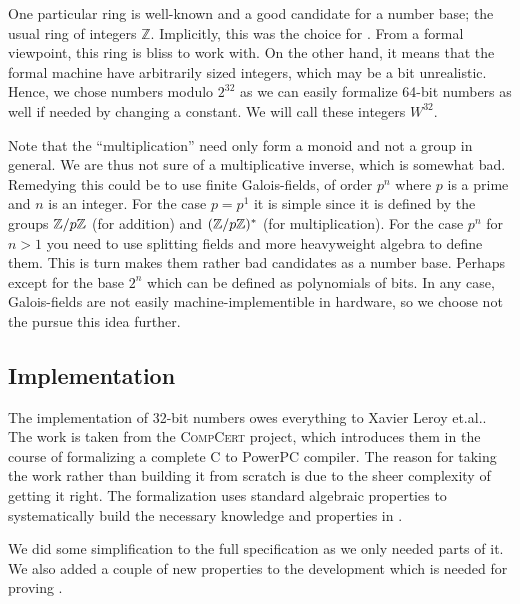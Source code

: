 One particular ring is well-known and a good candidate for a number
base; the usual ring of integers $\mathbb{Z}$. Implicitly,
this was the choice for \janusz{}. From a formal viewpoint, this ring
is bliss to work with. On the other hand, it means that the formal
machine have arbitrarily sized integers, which may be a bit
unrealistic. Hence, we chose numbers modulo $2^{32}$ as we can easily
formalize 64-bit numbers as well if needed by changing a constant. We
will call these integers $W^{32}$.

\begin{rem}
  Note that the ``multiplication'' need only form a monoid and not a
  group in general. We are thus not sure of a multiplicative inverse,
  which is somewhat bad. Remedying this could be to use finite
  Galois-fields, of order $p^n$ where $p$ is a prime and $n$ is an
  integer. For the case $p = p^1$ it is simple since it is defined by
  the groups $\mathbb{Z} / p\mathbb{Z}$ (for addition) and $(\mathbb{Z} / p\mathbb{Z})^{*}$ (for
  multiplication). For the case $p^n$ for $n > 1$ you need to use
  splitting fields and more heavyweight algebra to define them. This
  is turn makes them rather bad candidates as a number base. Perhaps
  except for the base $2^n$ which can be defined as polynomials of
  bits. In any case, Galois-fields are not easily
  machine-implementible in hardware, so we choose not the pursue this
  idea further.
\end{rem}

\subsection{\coq{} Implementation}

The \coq{} implementation of 32-bit numbers owes everything to Xavier
Leroy et.al.\cite{leroy:compcert}. The work is taken from the
\textsc{CompCert} project, which introduces them in the course of
formalizing a complete C to PowerPC compiler. The reason for taking
the work rather than building it from scratch is due to the sheer
complexity of getting it right. The formalization uses standard
algebraic properties to systematically build the necessary knowledge
and properties in \coq{}.

We did some simplification to the full specification as we only needed
parts of it. We also added a couple of new properties to the
development which is needed for proving \januso{}.

